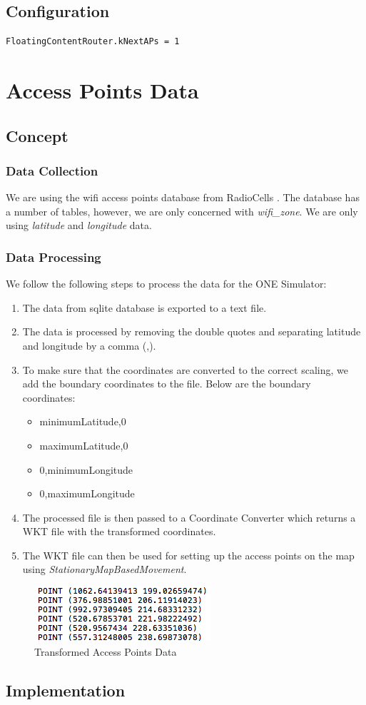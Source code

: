 \subsection{Configuration}
\begin{lstlisting}[language=bash]
FloatingContentRouter.kNextAPs = 1
\end{lstlisting}
\newpage
\section{Access Points Data}
\subsection{Concept}
\subsubsection{Data Collection}
We are using the wifi access points database from RadioCells \cite{wifi-data}. The database has a number of tables, however, we are only concerned with \textit{wifi\_zone}. We are only using \textit{latitude} and \textit{longitude} data.
\subsubsection{Data Processing}
We follow the following steps to process the data for the ONE Simulator:
\begin{enumerate}
	\item The data from sqlite database is exported to a text file. 
	\item The data is processed by removing the double quotes and separating latitude and longitude by a comma (,).
	\item To make sure that the coordinates are converted to the correct scaling, we add the boundary coordinates to the file. Below are the boundary coordinates:
	\begin{itemize}
		\item minimumLatitude,0
		\item maximumLatitude,0
		\item 0,minimumLongitude
		\item 0,maximumLongitude
	\end{itemize}
	\item The processed file is then passed to a Coordinate Converter which returns a WKT file with the transformed coordinates.
	\item The WKT file can then be used for setting up the access points on the map using \textit{StationaryMapBasedMovement}.
\end{enumerate}
\begin{figure}[h]
	\centering
	\includegraphics{./figures/access-points-data}
	\caption{Transformed Access Points Data}
\end{figure}
\subsection{Implementation}
